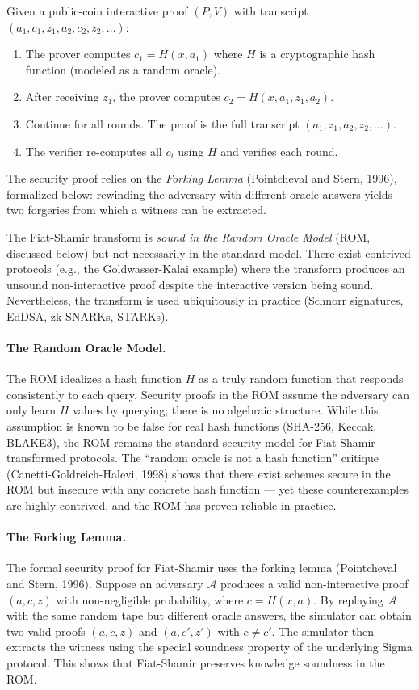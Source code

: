 \begin{definition}
Given a public-coin interactive proof $(P,V)$ with transcript $(a_1, c_1, z_1, a_2, c_2, z_2, \dots)$:
\begin{enumerate}
\item The prover computes $c_1 = H(x, a_1)$ where $H$ is a cryptographic hash function (modeled as a random oracle).
\item After receiving $z_1$, the prover computes $c_2 = H(x, a_1, z_1, a_2)$.
\item Continue for all rounds. The proof is the full transcript $(a_1, z_1, a_2, z_2, \dots)$.
\item The verifier re-computes all $c_i$ using $H$ and verifies each round.
\end{enumerate}
\end{definition}

The security proof relies on the \emph{Forking Lemma} (Pointcheval and Stern, 1996), formalized below: rewinding the adversary with different oracle answers yields two forgeries from which a witness can be extracted.

The Fiat-Shamir transform is \emph{sound in the Random Oracle Model} (ROM, discussed below) but not necessarily in the standard model. There exist contrived protocols (e.g., the Goldwasser-Kalai example) where the transform produces an unsound non-interactive proof despite the interactive version being sound. Nevertheless, the transform is used ubiquitously in practice (Schnorr signatures, EdDSA, zk-SNARKs, STARKs).

\paragraph{The Random Oracle Model.} The ROM idealizes a hash function $H$ as a truly random function that responds consistently to each query. Security proofs in the ROM assume the adversary can only learn $H$ values by querying; there is no algebraic structure. While this assumption is known to be false for real hash functions (SHA-256, Keccak, BLAKE3), the ROM remains the standard security model for Fiat-Shamir-transformed protocols. The ``random oracle is not a hash function'' critique (Canetti-Goldreich-Halevi, 1998) shows that there exist schemes secure in the ROM but insecure with any concrete hash function --- yet these counterexamples are highly contrived, and the ROM has proven reliable in practice.

\paragraph{The Forking Lemma.} The formal security proof for Fiat-Shamir uses the forking lemma (Pointcheval and Stern, 1996). Suppose an adversary $\mathcal{A}$ produces a valid non-interactive proof $(a, c, z)$ with non-negligible probability, where $c = H(x, a)$. By replaying $\mathcal{A}$ with the same random tape but different oracle answers, the simulator can obtain two valid proofs $(a, c, z)$ and $(a, c', z')$ with $c \neq c'$. The simulator then extracts the witness using the special soundness property of the underlying Sigma protocol. This shows that Fiat-Shamir preserves knowledge soundness in the ROM.

